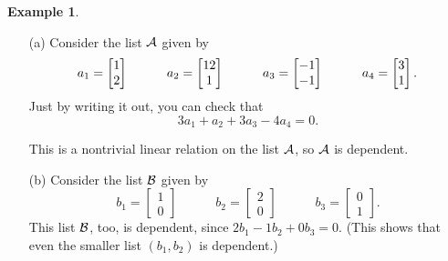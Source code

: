 \documentclass[reqno]{amsart}
\theoremstyle{definition}
\newtheorem{example}[theorem]{Example}
\begin{document}
\begin{example}\label{eg-dep-ii}
\begin{itemize}
 \item[(a)]
 Consider the list $\mathcal{A}$ given by
 \[ a_1 = \left[\begin{matrix}  1 \\  2 \end{matrix}\right] \hspace{3em}
    a_2 = \left[\begin{matrix} 12 \\  1 \end{matrix}\right] \hspace{3em}
    a_3 = \left[\begin{matrix} -1 \\ -1 \end{matrix}\right] \hspace{3em}
    a_4 = \left[\begin{matrix}  3 \\  1 \end{matrix}\right].
 \]
 Just by writing it out, you can check that
 \[ 3a_1 + a_2 + 3a_3 -4a_4 = 0. \]
 \begin{center}
 \end{center}
 This is a nontrivial linear relation on the list $\mathcal{A}$, so $\mathcal{A}$ is
 dependent.
 
 \item[(b)]
 Consider the list $\mathcal{B}$ given by
 \[
    b_1 = \begin{bmatrix} 1 \\ 0 \end{bmatrix} \hspace{3em}
    b_2 = \begin{bmatrix} 2 \\ 0 \end{bmatrix} \hspace{3em}
    b_3 = \begin{bmatrix} 0 \\ 1 \end{bmatrix} .
 \]
 This list $\mathcal{B}$, too, is dependent, since
 $2 b_1 - 1 b_2 + 0 b_3 = 0$.
 (This shows that even the smaller list $\left( b_1, b_2 \right)$
 is dependent.)
\end{itemize}
\end{example}
\end{document}
